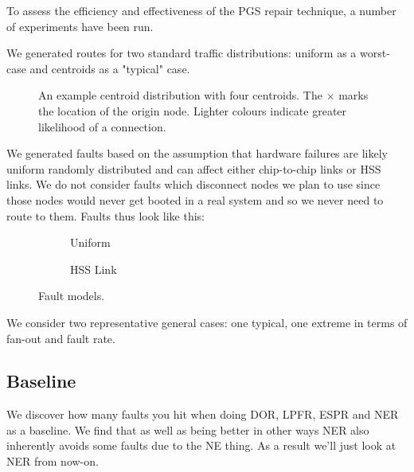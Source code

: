 		To assess the efficiency and effectiveness of the PGS repair technique,
		a number of experiments have been run.
		
		
		We generated routes for two standard traffic distributions: uniform as a
		worst-case and centroids as a "typical" case.
		
		\begin{figure}
			\center
			
			\caption{An example centroid distribution with four centroids. The
			$\times$ marks the location of the origin node. Lighter colours indicate
			greater likelihood of a connection.}
			\label{fig:traffic-distribution-centroids}
		\end{figure}
		
		We generated faults based on the assumption that hardware failures are
		likely uniform randomly distributed and can affect either chip-to-chip
		links or HSS links. We do not consider faults which disconnect nodes we
		plan to use since those nodes would never get booted in a real system and
		so we never need to route to them. Faults thus look like this:
		
		\begin{figure}
			\center
			\begin{subfigure}{0.48\linewidth}
				\hspace*{-1.5cm}
				
				\caption{Uniform}
				\label{fig:fault-example-uniform}
			\end{subfigure}
			\begin{subfigure}{0.48\linewidth}
				\hspace*{-1.5cm}
				
				\caption{HSS Link}
				\label{fig:fault-example-hss}
			\end{subfigure}
			
			\caption{Fault models.}
			\label{fig:fault-example}
		\end{figure}
		
		We consider two representative general cases: one typical, one extreme in
		terms of fan-out and fault rate.
		
		\subsection{Baseline}
		
			We discover how many faults you hit when doing DOR, LPFR, ESPR and NER
			as a baseline. We find that as well as being better in other ways NER
			also inherently avoids some faults due to the NE thing. As a result
			we'll just look at NER from now-on.
			
